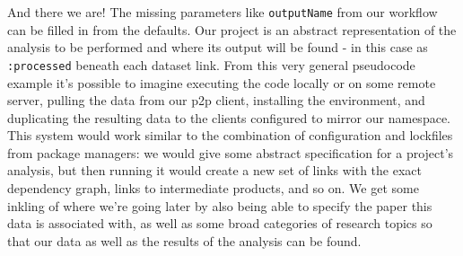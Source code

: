 \protect\hypertarget{myproject-analysis}{}{}

\begin{Shaded}
\begin{Highlighting}[]





\end{Highlighting}
\end{Shaded}

And there we are! The missing parameters like \texttt{outputName} from
our workflow can be filled in from the defaults. Our project is an
abstract representation of the analysis to be performed and where its
output will be found - in this case as \texttt{:processed} beneath each
dataset link. From this very general pseudocode example it's possible to
imagine executing the code locally or on some remote server, pulling the
data from our p2p client, installing the environment, and duplicating
the resulting data to the clients configured to mirror our namespace.
This system would work similar to the combination of configuration and
lockfiles from package managers: we would give some abstract
specification for a project's analysis, but then running it would create
a new set of links with the exact dependency graph, links to
intermediate products, and so on. We get some inkling of where we're
going later by also being able to specify the paper this data is
associated with, as well as some broad categories of research topics so
that our data as well as the results of the analysis can be found.

